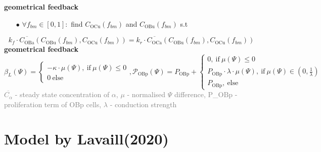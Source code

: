 \documentclass[%
aspectratio=169,  %
]{beamer}
\begin{document}
\begin{frame}
\textbf{geometrical feedback}
\begin{itemize}
\item[$\bullet$] $\forall f_{bm} \in [0,1]:$ find $C_\text{OCu}(f_{bm})$ and $C_\text{OBu}(f_{bm})$ s.t 
\end{itemize}
\begin{equation}
 k_f \cdot \overline{C_\text{OBa}} (C_\text{OBu}(f_{bm}),C_\text{OCu}(f_{bm})) = k_r \cdot  \overline{C_\text{OCa}}(C_\text{OBu}(f_{bm}),C_\text{OCu}(f_{bm})) 
\end{equation}
\textbf{geometrical feedback}
\begin{equation}
	\beta_L (\Psi) = \begin{cases} -\kappa \cdot \mu(\Psi), ~ \text{if} ~ \mu(\Psi) \leq 0\\
		0 ~ \text{else} \end{cases}, 
	\mathcal{P}_\text{OBp} (\Psi) =P_\text{OBp}  +  \begin{cases} 0 , ~ \text{if} ~ \mu(\Psi) \leq 0 \\ 
															P_\text{OBp}  \cdot \lambda \cdot \mu(\Psi) ,~\text{if} ~\mu(\Psi) \in(0,\frac{1}{\lambda}) \\
														P_\text{OBp},  ~\text{else}
											\end{cases}
\label{eq:model3-feedback}
\end{equation}
\textcolor{gray}{$\overline{C_\alpha}$ - steady state concentration of $\alpha$, $\mu$ - normalised $\Psi$ difference, P_$\text{OBp}$ - proliferation term of OBp cells, $\lambda$ - conduction strength}
\end{frame}

\section*{Model by Lavaill(2020)}
\end{document}

